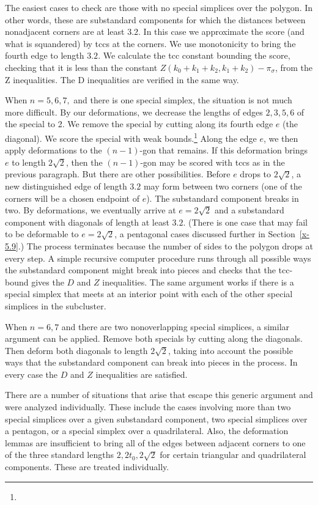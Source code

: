 The easiest cases to check are those with no special simplices over the
polygon.  In other words, these are substandard components for which the distances
between nonadjacent corners are at least $3.2$.  In this case we
approximate the score (and what is squandered) by tccs at the corners.
We use monotonicity to bring the fourth edge to length $3.2$. We
calculate the tcc constant bounding the score, checking that it is less
than the constant
    $ Z(k_0+k_1+k_2,k_1+k_2) - \pi_\sigma$,
from the Z inequalities. The D inequalities  are verified in the same
way.

When $n=5,6,7,$ and there is one special simplex, the situation is not
much more difficult.  By our deformations,  we decrease the lengths of
edges $2,3,5,6$ of the special to 2. We remove the special by cutting
along its fourth edge $e$ (the diagonal).  We score the special with
weak bounds.\footnote{} %
Along the edge $e$, we then apply deformations to the $(n-1)$-gon
that remains. If this deformation brings $e$ to length
$2\sqrt{2}$, then the $(n-1)$-gon may be scored with tccs as in
the previous paragraph.  But there are other possibilities. Before
$e$ drops to $2\sqrt{2}$, a new distinguished edge of length $3.2$
may form between two corners (one of the corners will be a chosen
endpoint of $e$).  The substandard component breaks in two. By deformations,
we eventually arrive at $e=2\sqrt2$ and a substandard component with diagonals
of length at least $3.2$.  (There is one case that may fail to be
deformable to $e=2\sqrt2$, a pentagonal cases discussed further in
Section~\ref{x-5.9}.) The process terminates because the number of
sides to the polygon drops at every step. A simple recursive
computer procedure runs through all possible ways the substandard component
might break into pieces and checks that the tcc-bound gives the
$D$ and $Z$ inequalities. The same argument works if there is a
special simplex that meets at an interior point with each of the
other special simplices in the subcluster.

When $n=6,7$ and there are two nonoverlapping special simplices, a
similar argument can be applied. Remove both specials by cutting along
the diagonals. Then deform both diagonals to length $2\sqrt{2}$, taking
into account the possible ways that the substandard component can break into pieces
in the process.  In every case the $D$ and $Z$ inequalities are
satisfied.

There are a number of situations that arise that escape this generic
argument and were analyzed individually. These include the cases
involving more than two special simplices over a given substandard component, two
special simplices over a pentagon, or a special simplex over a
quadrilateral.  Also, the deformation lemmas are insufficient to bring
all of the edges between adjacent corners to one of the three standard
lengths $2,2t_0,2\sqrt{2}$ for certain triangular and quadrilateral
components.  These are treated individually.

